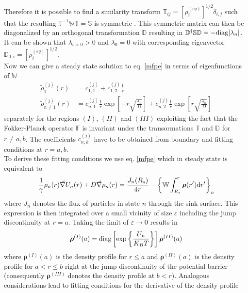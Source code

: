 \documentclass[twocolumn,superscriptaddress]{revtex4}
\newcommand{\vect}[1]{\boldsymbol{\mathbf{#1}}}
\begin{document}
Therefore it is possible to find a similarity transform $\mathbb{T}_{ij}=[\rho_i^{(eq)}]^{1/2}\delta_{i,j}$ such that the resulting $\mathbb{T}^{-1}\mathbb{W}\mathbb{T} = \mathbb{S}$ is symmetric \cite{Oppenheim1977}. This symmetric matrix can then be diagonalized by an orthogonal transformation $\mathbb{D}$ resulting in $\mathbb{D}^{\dagger}\mathbb{S}\mathbb{D} = - {\rm diag}[\lambda_n]$. It can be shown \cite{VanKampen1992} that $\lambda_{i>0}>0$ and $\lambda_0=0$ with corresponding eigenvector $\mathbb{D}_{0,i}=[\rho_i^{(eq)}]^{1/2}$.  \\
Now we can give a steady state solution to eq. \eqref{mfpe} in terms of eigenfunctions of $\mathbb{W}$
\begin{align}
    \label{solution}
    \tilde{\rho}_{1}^{(j)}(r) &= c_{1,1}^{(j)} + c_{1,2}^{(j)} \frac{1}{r} \\
    \tilde{\rho}_{n \ne 1}^{(j)}(r) &= c_{n,1}^{(j)}\frac{1}{r} \exp\left[-r\sqrt{\frac{\lambda_n}{D}}\right] + c_{n,2}^{(j)}\frac{1}{r} \exp\left[r\sqrt{\frac{\lambda_n}{D}}\right]  \nonumber
\end{align}
separately for the regions $(I)$, $(II)$ and $(III)$ exploiting the fact that the Fokker-Planck operator $\mathbb{F}$ is invariant under the transormations $\mathbb{T}$ and $\mathbb{D}$ for $r\ne a, b$. The coefficients $c^{(j)}_{n,k}$ have to be obtained from boundary and fitting conditions at $r=a,b$. \\
To derive these fitting conditions we use eq. \eqref{mfpe} which in steady state is equivalent to
\begin{equation*}
     \frac{1}{\gamma}\rho_n(r) \vec{\nabla} U_n(r) + D \vec{\nabla} \rho_n(r) = \frac{J_n(R_s)}{4 \pi} - \left\{ \mathbb{W} \int_{R_s}^{r} \vect{\rho}(r') {\rm d} r' \right\}_{n}
\end{equation*}
where $J_n$ denotes the flux of particles in state $n$ through the sink surface. This expression is then integrated over a small vicinity of size $\varepsilon$ including the jump discontinuity at $r = a$. Taking the limit of $\varepsilon \rightarrow 0$ results in 
\begin{equation}
    \vect{\rho}^{(I)}(a) = {\rm diag}\left[\exp\left\{\frac{U_n}{K_B T} \right\}\right]\vect{\rho}^{(II)}(a)
    \label{dens_fit1}
\end{equation}
where $\vect{\rho}^{(I)}(a)$ is the density profile for $r \le a$ and $\vect{\rho}^{(II)}(a)$ is the density profile for $ a<r\le b$ right at the jump discontinuity of the potential barrier (consequently $\vect{\rho}^{(III)}$ denotes the density profile at $b<r$). Analogous considerations lead to fitting conditions for the derivative of the density profile
\end{document}
